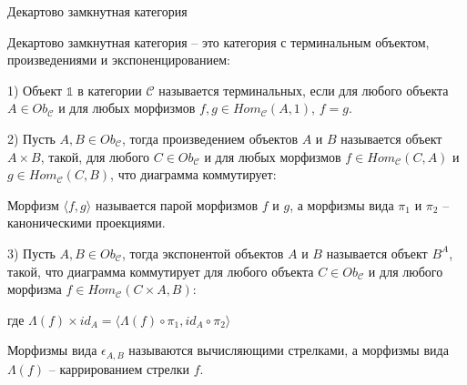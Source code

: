 \begin{defin} Декартово замкнутная категория

  Декартово замкнутная категория -- это категория с терминальным объектом, произведениями и экспоненцированием:

1) Объект $\mathds{1}$ в категории $\mathcal{C}$ называется терминальных, если для любого объекта $A \in Ob_{\mathcal{C}}$ и для любых морфизмов $f, g \in Hom_{\mathcal{C}}(A, 1)$, $f = g$.

2) Пусть $A, B \in Ob_{\mathcal{C}}$, тогда произведением объектов $A$ и $B$ называется объект $A \times B$, такой, для любого $C \in Ob_{\mathcal{C}}$ и для любых морфизмов $f \in Hom_{\mathcal{C}}(C, A)$ и $g \in Hom_{\mathcal{C}}(C, B)$,
что диаграмма коммутирует:


Морфизм $\langle f,g \rangle$ называется парой морфизмов $f$ и $g$, а морфизмы вида $\pi_1$ и $\pi_2$ -- каноническими проекциями.

3) Пусть $A, B \in Ob_{\mathcal{C}}$, тогда экспонентой объектов $A$ и $B$ называется объект $B^A$, такой, что диаграмма коммутирует для любого объекта $C \in Ob_{\mathcal{C}}$ и для любого морфизма $f \in Hom_{\mathcal{C}}(C \times A, B)$:

где $\Lambda(f) \times id_A = \langle \Lambda(f) \circ \pi_1, id_A \circ \pi_2 \rangle$

Морфизмы вида $\epsilon_{A,B}$ называются вычисляющими стрелками, а морфизмы вида $\Lambda(f)$ -- каррированием стрелки $f$.
\end{defin}


